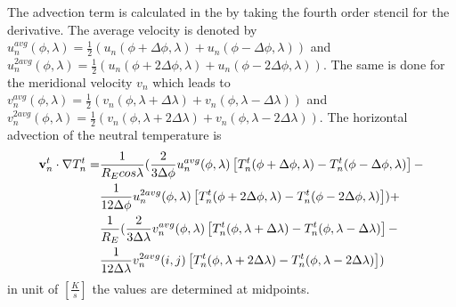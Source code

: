  The advection term is calculated in the
 by taking the fourth order stencil for the
derivative. The average velocity is denoted by
$u_n^{avg}(\phi,\lambda) = \frac{1}{2} (u_n(\phi+\Delta
\phi,\lambda) + u_n (\phi-\Delta \phi,\lambda))$ and $u_n^{2
avg}(\phi,\lambda)  = \frac{1}{2} (u_n(\phi+2\Delta \phi,\lambda) +
u_n (\phi-2\Delta \phi,\lambda))$. The same is done for the
meridional velocity $v_n$ which leads to $v_n^{avg}(\phi,\lambda)  =
\frac{1}{2} (v_n(\phi,\lambda + \Delta \lambda) + v_n (\phi,\lambda
- \Delta \lambda))$ and $v_n^{2 avg}(\phi,\lambda)  = \frac{1}{2}
(v_n(\phi,\lambda + 2 \Delta \lambda) + v_n (\phi,\lambda - 2 \Delta
\lambda))$. The horizontal advection of the neutral temperature is
%
\begin{align}
 \mathbf{v}_n^t\cdot \nabla T_n^t = &
  \frac{1}{R_E cos \lambda} ( \frac{2}
   {3 \Delta \phi}u_n^{avg}(\phi,\lambda) \left[
   T_n^t(\phi+\Delta \phi,\lambda) - T_n^t(\phi-\Delta \phi,\lambda)  \right]
- \notag \\
    {} & \frac{1}{12 \Delta \phi}u_n^{2avg}(\phi,\lambda) \left[
   T_n^t(\phi+2\Delta \phi,\lambda) - T_n^t(\phi-2\Delta \phi,\lambda)  \right]
   )+ \notag \\
   {}&
   \frac{1}{R_E} ( \frac{2}{3 \Delta \lambda}v_n^{avg}(\phi,\lambda) \left[
   T_n^t(\phi,\lambda + \Delta \lambda) - T_n^t(\phi,\lambda - \Delta \lambda)  \right]
- \notag \\
    {}& \frac{1}{12 \Delta \lambda}v_n^{2avg}(i,j) \left[
   T_n^t(\phi,\lambda + 2 \Delta \lambda) -
T_n^t(\phi,\lambda - 2 \Delta \lambda)  \right] )
\end{align}
%
in unit of $[\frac{K}{s}]$ the values are determined at midpoints. \\
%

